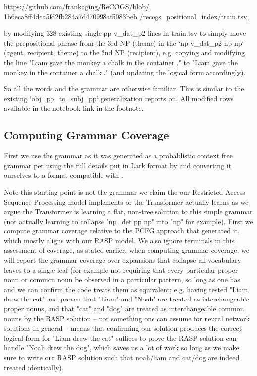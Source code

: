 \documentclass[11pt]{article}
\begin{document}
\href{https://github.com/frankaging/ReCOGS/blob/1b6eca8ff4dca5fd2fb284a7d470998af5083beb/recogs_positional_index/train.tsv}{https://github.com/frankaging/ReCOGS/blob/
1b6eca8ff4dca5fd2fb284a7d470998af5083beb
/recogs\_positional\_index/train.tsv},

by modifying 328 existing single-pp v\_dat\_p2 lines in train.tsv to simply move the prepositional phrase from the 3rd NP (theme) in the `np v\_dat\_p2 np np` (agent, recipient, theme) to the 2nd NP (recipient), e.g. copying and modifying the line "Liam gave the monkey a chalk in the container ." to "Liam gave the monkey in the container a chalk ." (and updating the logical form accordingly).

So all the words and the grammar are otherwise familiar. This is similar to the existing `obj\_pp\_to\_subj\_pp` generalization \citep{Wu2023} reports on.
All modified rows available in the notebook link in the footnote.

\clearpage

\subsection{Computing Grammar Coverage}
\label{computing_grammar_coverage}

First we use the grammar as it was generated as a probablistic context free grammar per \citep{KimLinzen2020}
using the full details put in Lark format by \citep{klinger2024compositionalprogramgenerationfewshot}
and converting it ourselves to a format compatible with \citep{fuzzingbook2023:GrammarCoverageFuzzer}.

Note this starting point is not the grammar we claim the our Restricted Access Sequence Processing model implements or the Transformer actually learns as we argue the Transformer is learning a flat, non-tree solution to this simple grammar (not actually learning to collapse "np\_det pp np" into "np" for example). First we compute grammar coverage relative to the PCFG approach that generated it, which mostly aligns with our RASP model. We also ignore terminals in this assessment of coverage, as stated earlier, when computing grammar coverage, we will report the grammar coverage over expansions that collapse all vocabulary leaves to a single leaf (for example not requiring that every particular proper noun or common noun be observed in a particular pattern, so long as one has and we can confirm the code treats them as equivalent; e.g. having tested "Liam drew the cat" and proven that "Liam" and "Noah" are treated as interchangeable proper nouns, and that "cat" and "dog" are treated as interchangeable common nouns by the RASP solution -- not something one can assume for neural network solutions in general -- means that confirming our solution produces the correct logical form for "Liam drew the cat" suffices to prove the RASP solution can handle "Noah drew the dog", which saves us a lot of work so long as we make sure to write our RASP solution such that noah/liam and cat/dog are indeed treated identically).
\end{document}
